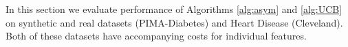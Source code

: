\documentclass[11pt]{article} %
\begin{document}
%

%
In this section we evaluate performance of Algorithms \ref{alg:asym} and \ref{alg:UCB} on synthetic and real datasets (PIMA-Diabetes) and Heart Disease (Cleveland). Both of these datasets have accompanying costs for individual features.%
\end{document}
